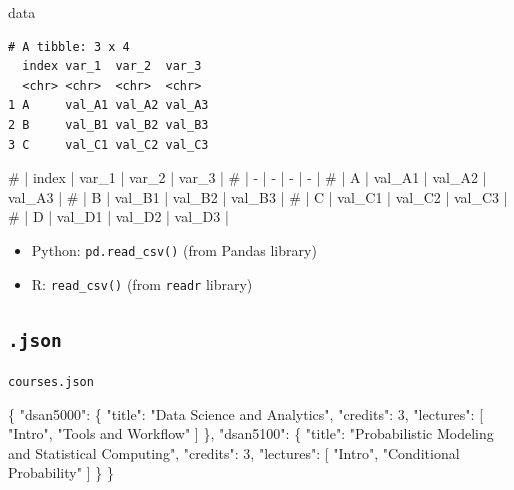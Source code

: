 \documentclass[
  letterpaper,
  DIV=11,
  numbers=noendperiod,
  oneside]{scrreprt}
\newenvironment{Shaded}{\begin{snugshade}}{\end{snugshade}}
\newcommand{\CommentTok}[1]{\textcolor[rgb]{0.37,0.37,0.37}{#1}}
\newcommand{\DataTypeTok}[1]{\textcolor[rgb]{0.68,0.00,0.00}{#1}}
\newcommand{\DecValTok}[1]{\textcolor[rgb]{0.68,0.00,0.00}{#1}}
\newcommand{\FunctionTok}[1]{\textcolor[rgb]{0.28,0.35,0.67}{#1}}
\newcommand{\NormalTok}[1]{\textcolor[rgb]{0.00,0.23,0.31}{#1}}
\newcommand{\OtherTok}[1]{\textcolor[rgb]{0.00,0.23,0.31}{#1}}
\newcommand{\StringTok}[1]{\textcolor[rgb]{0.13,0.47,0.30}{#1}}
\providecommand{\tightlist}{%
  \setlength{\itemsep}{0pt}\setlength{\parskip}{0pt}}\usepackage{longtable,booktabs,array}
\begin{document}
\begin{Shaded}
\begin{Highlighting}[]
\NormalTok{data}
\end{Highlighting}
\end{Shaded}

\begin{verbatim}
# A tibble: 3 x 4
  index var_1  var_2  var_3 
  <chr> <chr>  <chr>  <chr> 
1 A     val_A1 val_A2 val_A3
2 B     val_B1 val_B2 val_B3
3 C     val_C1 val_C2 val_C3
\end{verbatim}

\begin{Shaded}
\begin{Highlighting}[]
\CommentTok{\# | index | var\_1 | var\_2 | var\_3 |}
\CommentTok{\# | {-} | {-} | {-} | {-} |}
\CommentTok{\# | A | val\_A1 | val\_A2 | val\_A3 |}
\CommentTok{\# | B | val\_B1 | val\_B2 | val\_B3 |}
\CommentTok{\# | C | val\_C1 | val\_C2 | val\_C3 |}
\CommentTok{\# | D | val\_D1 | val\_D2 | val\_D3 | }
\end{Highlighting}
\end{Shaded}

\begin{itemize}
\tightlist
\item
  Python: \texttt{pd.read\_csv()} (from Pandas library)
\item
  R: \texttt{read\_csv()} (from \texttt{readr} library)
\end{itemize}

\hypertarget{json}{%
\subsection{\texorpdfstring{\texttt{.json}}{.json}}\label{json}}

\begin{codelisting}

\caption{\texttt{courses.json}}

\begin{Shaded}
\begin{Highlighting}[]
\FunctionTok{\{}
  \DataTypeTok{"dsan5000"}\FunctionTok{:} \FunctionTok{\{}
    \DataTypeTok{"title"}\FunctionTok{:} \StringTok{"Data Science and Analytics"}\FunctionTok{,}
    \DataTypeTok{"credits"}\FunctionTok{:} \DecValTok{3}\FunctionTok{,}
    \DataTypeTok{"lectures"}\FunctionTok{:} \OtherTok{[}
      \StringTok{"Intro"}\OtherTok{,}
      \StringTok{"Tools and Workflow"}
    \OtherTok{]}
  \FunctionTok{\},}
  \DataTypeTok{"dsan5100"}\FunctionTok{:} \FunctionTok{\{}
    \DataTypeTok{"title"}\FunctionTok{:} \StringTok{"Probabilistic Modeling and Statistical Computing"}\FunctionTok{,}
    \DataTypeTok{"credits"}\FunctionTok{:} \DecValTok{3}\FunctionTok{,}
    \DataTypeTok{"lectures"}\FunctionTok{:} \OtherTok{[}
      \StringTok{"Intro"}\OtherTok{,}
      \StringTok{"Conditional Probability"}
    \OtherTok{]}
  \FunctionTok{\}}
\FunctionTok{\}}
\end{Highlighting}
\end{Shaded}

\end{codelisting}
\end{document}
